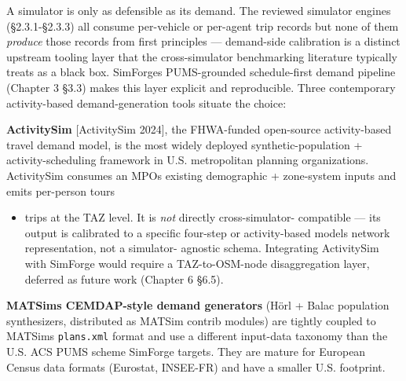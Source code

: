 A simulator is only as defensible as its demand. The reviewed simulator
engines (§2.3.1-§2.3.3) all consume per-vehicle or per-agent trip
records but none of them \emph{produce} those records from first
principles --- demand-side calibration is a distinct upstream tooling
layer that the cross-simulator benchmarking literature typically treats
as a black box. SimForge\textquotesingle s PUMS-grounded schedule-first
demand pipeline (Chapter 3 §3.3) makes this layer explicit and
reproducible. Three contemporary activity-based demand-generation tools
situate the choice:

\textbf{ActivitySim} {[}ActivitySim 2024{]}, the FHWA-funded open-source
activity-based travel demand model, is the most widely deployed
synthetic-population + activity-scheduling framework in U.S.
metropolitan planning organizations. ActivitySim consumes an
MPO\textquotesingle s existing demographic + zone-system inputs and
emits per-person tours

\begin{itemize}
\tightlist
\item
  trips at the TAZ level. It is \emph{not} directly cross-simulator-
  compatible --- its output is calibrated to a specific four-step or
  activity-based model\textquotesingle s network representation, not a
  simulator- agnostic schema. Integrating ActivitySim with SimForge
  would require a TAZ-to-OSM-node disaggregation layer, deferred as
  future work (Chapter 6 §6.5).
\end{itemize}

\textbf{MATSim\textquotesingle s CEMDAP-style demand generators} (Hörl +
Balac population synthesizers, distributed as MATSim contrib modules)
are tightly coupled to MATSim\textquotesingle s \texttt{plans.xml}
format and use a different input-data taxonomy than the U.S. ACS PUMS
scheme SimForge targets. They are mature for European Census data
formats (Eurostat, INSEE-FR) and have a smaller U.S. footprint.

